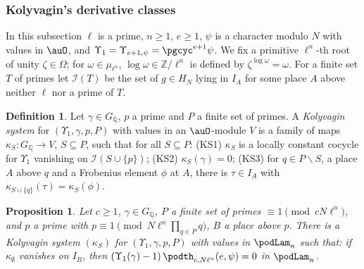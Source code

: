 \documentclass[10pt]{amsart}
\newtheorem{proposition}[theorem]{Proposition}
\theoremstyle{definition}
\newtheorem{definition}[theorem]{Definition}
\theoremstyle{remark}
\newcommand{\Z}{\mathbb Z}
\newcommand{\Q}{\mathbb Q}
\begin{document}
\subsubsection{Kolyvagin's derivative classes}\label{pod:ss-koly}

In this subsection $\ell$ is a prime, $n\ge1$, $e\ge1$, $\psi$ is a character modulo $N$ with values
in $\auO$, and $\Upsilon_1=\Upsilon_{e+1,\psi}=\pgcyc^{e+1}\psi$. We fix a primitive $\ell^n$-th root
of unity $\zeta\in\Omega$; for $\omega\in\mu_{\ell^n}$, $\log\omega\in\Z/\ell^n$ is defined by
$\zeta^{\log\omega}=\omega$. For a finite set $T$ of primes let $\mathcal I(T)$ be the set of
$g\in H_N$ lying in $I_A$ for some place $A$ above neither $\ell$ nor a prime of $T$.

\begin{definition}\label{pod:def-KS}
Let $\gamma\in G_\Q$, $p$ a prime and $P$ a finite set of primes. A \emph{Kolyvagin system} for
$(\Upsilon_1,\gamma,p,P)$ with values in an $\auO$-module $V$ is a family of maps $\kappa_S\colon
G_\Q\to V$, $S\subseteq P$, such that for all $S\subseteq P$: (KS1) $\kappa_S$ is a locally constant
cocycle for $\Upsilon_1$ vanishing on $\mathcal I(S\cup\{p\})$; (KS2) $\kappa_S(\gamma)=0$; (KS3) for
$q\in P\smallsetminus S$, a place $A$ above $q$ and a Frobenius element $\phi$ at $A$, there is
$\tau\in I_A$ with $\kappa_{S\cup\{q\}}(\tau)=\kappa_S(\phi)$.
\end{definition}

\begin{proposition}\label{pod:KS}
Let $c\ge1$, $\gamma\in G_\Q$, $P$ a finite set of primes $\equiv1\pmod{cN\ell^n}$, and $p$ a prime
with $p\equiv1\pmod{N\ell^n\prod_{q\in P}q}$, $B$ a place above $p$. There is a Kolyvagin system
$(\kappa_S)$ for $(\Upsilon_1,\gamma,p,P)$ with values in $\podLam_n$ such that: if $\kappa_\emptyset$
vanishes on $I_B$, then $(\Upsilon_1(\gamma)-1)\,\podth_{c,N\ell^n}(e,\psi)=0$ in $\podLam_n$.
\end{proposition}
\end{document}
